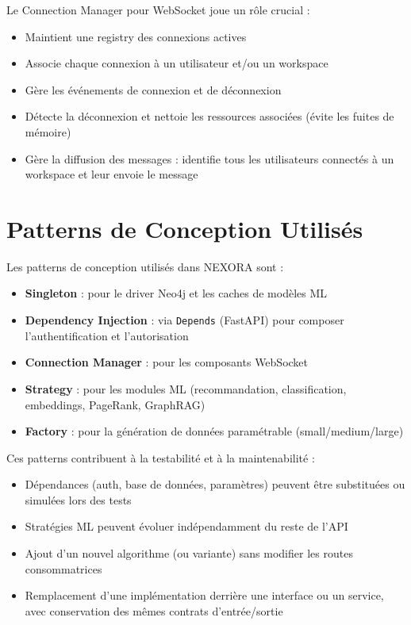 \documentclass[12pt,a4paper]{report}
\begin{document}
Le Connection Manager pour WebSocket joue un rôle crucial :
\begin{itemize}
  \item Maintient une registry des connexions actives
  \item Associe chaque connexion à un utilisateur et/ou un workspace
  \item Gère les événements de connexion et de déconnexion
  \item Détecte la déconnexion et nettoie les ressources associées (évite les fuites de mémoire)
  \item Gère la diffusion des messages : identifie tous les utilisateurs connectés à un workspace et leur envoie le message
\end{itemize}

\section{Patterns de Conception Utilisés}
Les patterns de conception utilisés dans NEXORA sont :
\begin{itemize}
  \item \textbf{Singleton} : pour le driver Neo4j et les caches de modèles ML
  \item \textbf{Dependency Injection} : via \texttt{Depends} (FastAPI) pour composer l'authentification et l'autorisation
  \item \textbf{Connection Manager} : pour les composants WebSocket
  \item \textbf{Strategy} : pour les modules ML (recommandation, classification, embeddings, PageRank, GraphRAG)
  \item \textbf{Factory} : pour la génération de données paramétrable (small/medium/large)
\end{itemize}

Ces patterns contribuent à la testabilité et à la maintenabilité :
\begin{itemize}
  \item Dépendances (auth, base de données, paramètres) peuvent être substituées ou simulées lors des tests
  \item Stratégies ML peuvent évoluer indépendamment du reste de l'API
  \item Ajout d'un nouvel algorithme (ou variante) sans modifier les routes consommatrices
  \item Remplacement d'une implémentation derrière une interface ou un service, avec conservation des mêmes contrats d'entrée/sortie
\end{itemize}
\end{document}
